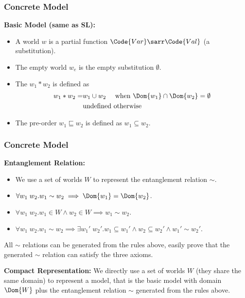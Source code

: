 \begin{frame}[fragile]
    \frametitle{Concrete Model}

\textbf{Basic Model (same as SL):} 
\begin{itemize}
    \item A world $w$ is a partial function $\Code{Var}\sarr\Code{Val}$ (a substitution).
    \item The empty world $w_e$ is the empty substitution $\emptyset$.
    \item The $w_1 * w_2$ is defined as
    \begin{align*}
        w_1 * w_2 =& w_1 \cup w_2 \quad \text{ when } \Dom{w_1} \cap \Dom{w_2} = \emptyset
        \\& \text{undefined otherwise}
    \end{align*}\noindent
    \item The pre-order $w_1 \sqsubseteq w_2$ is defined as $w_1 \subseteq w_2$.
\end{itemize}
\end{frame}

\begin{frame}[fragile]
    \frametitle{Concrete Model}

\textbf{Entanglement Relation:} 
\begin{itemize}
    \item We use a set of worlds $W$ to represent the entanglement relation $\sim$.
    \item $\forall w_1\; w_2. w_1 \sim w_2 \implies \Dom{w_1} = \Dom{w_2}$.
    \item $\forall w_1\; w_2. w_1 \in W \land w_2 \in W \implies w_1 \sim w_2$.
    \item $\forall w_1\; w_2. w_1 \sim w_2 \implies \exists w_1'\;w_2'. w_1 \subseteq w_1' \land w_2 \subseteq w_2' \land w_1' \sim w_2'$.
\end{itemize}
All $\sim$ relations can be generated from the rules above, easily prove that the generated $\sim$ relation can satisfy the three axioms.

\textbf{Compact Representation:} We directly use a set of worlds $W$ (they share the same domain) to represent a model, that is the basic model with domain $\Dom{W}$ plus the entanglement relation $\sim$ generated from the rules above.
\end{frame}

